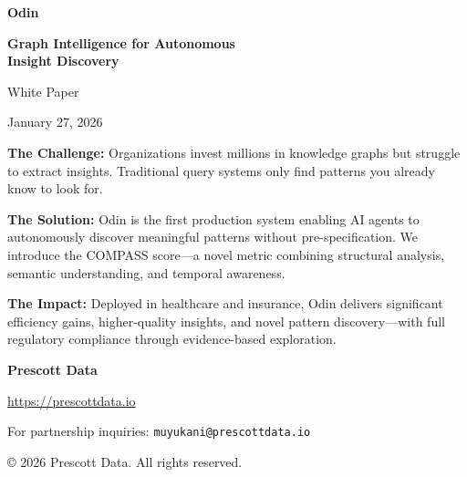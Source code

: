 \documentclass[11pt]{article}
\begin{document}
\begin{titlepage}
    \centering
    \vspace*{2cm}
    
    {\Huge\bfseries\color{prescottblue} Odin\par}
    \vspace{0.5cm}
    {\LARGE\bfseries Graph Intelligence for Autonomous\\Insight Discovery\par}
    \vspace{1.5cm}
    
    {\Large White Paper\par}
    \vspace{0.3cm}
    {\large January 27, 2026\par}
    \vspace{2cm}
    
    \begin{keybox}
    \textbf{The Challenge:} Organizations invest millions in knowledge graphs but struggle to extract insights. Traditional query systems only find patterns you already know to look for.
    
    \vspace{0.3cm}
    
    \textbf{The Solution:} Odin is the first production system enabling AI agents to autonomously discover meaningful patterns without pre-specification. We introduce the COMPASS score—a novel metric combining structural analysis, semantic understanding, and temporal awareness.
    
    \vspace{0.3cm}
    
    \textbf{The Impact:} Deployed in healthcare and insurance, Odin delivers significant efficiency gains, higher-quality insights, and novel pattern discovery—with full regulatory compliance through evidence-based exploration.
    \end{keybox}
    
    \vfill
    
    {\large\bfseries Prescott Data\par}
    {\large \url{https://prescottdata.io}\par}
    \vspace{0.3cm}
    {\normalsize For partnership inquiries: \texttt{muyukani@prescottdata.io}\par}
    
    \vspace{1cm}
    {\small © 2026 Prescott Data. All rights reserved.\par}
\end{titlepage}
\end{document}
